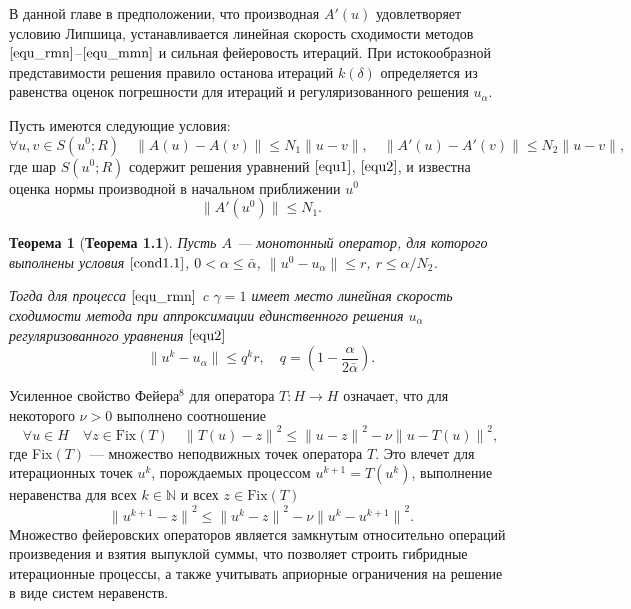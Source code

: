 \documentclass[%
autoref,     %
href,        %
colorlinks,  %
]{disser}
\newtheorem{theorem}{Теорема}
\begin{document}
В данной главе в предположении, что производная $A'(u)$ удовлетворяет условию Липшица, устанавливается линейная скорость сходимости методов $\eqref{equ_rmn}$--$\eqref{equ_mmn}$ и сильная фейеровость итераций. При истокообразной представимости решения правило останова итераций $k(\delta)$ определяется из равенства оценок погрешности для итераций и регуляризованного решения $u_\alpha$.

Пусть имеются следующие условия:
\begin{equation}\label{cond1.1}
\forall u, v \in S(u^0;R)\quad\|A(u)-A(v)\|\leqslant N_1\|u-v\|, \quad
\|A'(u)-A'(v)\|\leqslant N_2\|u-v\|,
\end{equation}
где шар $S(u^0;R)$ содержит решения уравнений $\eqref{equ1}$, $\eqref{equ2}$, и известна оценка нормы производной в начальном приближении $u^0$
\begin{equation}\label{cond1.3}
\|A'(u^0)\| \leqslant N_1.
\end{equation}

\begin{theorem}[\textbf{Теорема 1.1}]\label{teo2.1} Пусть $A$ --- монотонный оператор, для которого выполнены условия $\eqref{cond1.1}$, $0<\alpha \leqslant \bar\alpha$, $\|u^0-u_\alpha\| \leqslant r$, $r\leqslant \alpha/N_2$. 
	
	Тогда для процесса $\eqref{equ_rmn}$ c $\gamma=1$ имеет место линейная скорость сходимости метода при аппроксимации единственного решения $u_\alpha$ регуляризованного уравнения $\eqref{equ2}$
	\begin{equation}\label{nwt_conv}
	\| u^k-u_\alpha \| \leqslant q^kr, \quad q=(1-\frac{\alpha}{2\bar\alpha}).
	\end{equation}
\end{theorem}

Усиленное свойство Фейера$^8$ для оператора $T\colon H\to H$ означает, что для некоторого $\nu>0$ выполнено соотношение
\begin{equation}\label{fejer_prop_uni}
\forall u\in H\quad \forall z\in \text{Fix}(T)\quad {\|T(u)-z\|}^2\leqslant{\|u-z\|}^2-\nu{\|u-T(u)\|}^2,
\end{equation}
где Fix$(T)$ --- множество неподвижных точек оператора $T$. Это влечет для итерационных точек $u^k$, порождаемых процессом $u^{k+1}=T(u^k)$, выполнение неравенства для всех $k\in\mathbb{N}$ и всех $z\in \text{Fix}(T)$
\begin{equation}\label{fejer_prop_it}
{\|u^{k+1}-z\|}^2\leqslant{\|u^k-z\|}^2-\nu{\|u^k-u^{k+1}\|}^2.
\end{equation}
{\scriptsize
\let\thefootnote\relax\let\thefootnote\relax{}}
Множество фейеровских операторов является замкнутым относительно операций произведения и взятия выпуклой суммы, что позволяет строить гибридные итерационные процессы, а также учитывать априорные ограничения на решение в виде систем неравенств.
\end{document}
